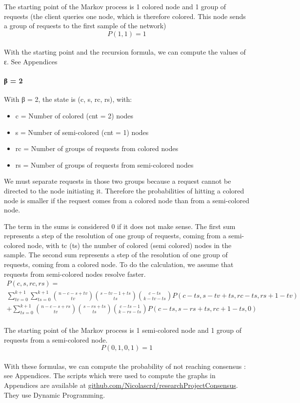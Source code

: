 \documentclass[11pt, twocolumn]{article}
\begin{document}
The starting point of the Markov process is 1 colored node and 1 group of requests (the client queries one node, which is therefore colored. This node sends a group of requests to the first sample of the network)
\begin{equation*}
    P(1, 1) = 1
\end{equation*}
\\
With the starting point and the recursion formula, we can compute the values of ε. See Appendices

\paragraph{β = 2}
With β = 2, the state is (c, s, rc, rs), with:
\begin{itemize}
    \item c = Number of colored (cnt = 2) nodes
    \item s = Number of semi-colored (cnt = 1) nodes
    \item rc = Number of groups of requests from colored nodes
    \item rs = Number of groups of requests from semi-colored nodes
\end{itemize}

We must separate requests in those two groups because a request cannot be directed to the node initiating it.
Therefore the probabilities of hitting a colored node is smaller if the request comes from a colored node than from a semi-colored node.

The term in the sums is considered 0 if it does not make sense.
The first sum represents a step of the resolution of one group of requests, coming from a semi-colored node, with tc (ts) the number of colored (semi colored) nodes in the sample.
The second sum represents a step of the resolution of one group of requests, coming from a colored node.
To do the calculation, we assume that requests from semi-colored nodes resolve faster.
\begin{multline*}
    P(c, s, rc, rs) = \\ \sum_{tv=0}^{k+1}\sum_{ts=0}^{k+1} {n-c-s+tv \choose tv}{s-tv-1+ts \choose ts}{c-ts \choose k-tv-ts}P(c-ts, s-tv+ts, rc-ts, rs+1-tv)
    \\ + \sum_{ts=0}^{k+1} {n-c-s+rs \choose tv}{s-rs+ts \choose ts}{c-ts-1 \choose k-rs-ts}P(c-ts, s-rs+ts, rc+1-ts, 0)
\end{multline*}
\\
The starting point of the Markov process is 1 semi-colored node and 1 group of requests from a semi-colored node.
\begin{equation*}
    P(0, 1, 0, 1) = 1
\end{equation*}
\\
With these formulas, we can compute the probability of not reaching consensus : see Appendices.
The scripts which were used to compute the graphs in Appendices are available at \href{https://github.com/Nicolascrd/researchProjectConsensus}{github.com/Nicolascrd/researchProjectConsensus}. They use Dynamic Programming.
\end{document}
